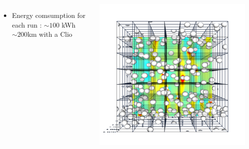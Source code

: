 \documentclass{sintefbeamer}
\begin{document}
\begin{frame}
\begin{columns}
{\begin{itemize}
 \item Energy comsumption for each run : $\sim 100$ kWh $\sim 200 $km with a Clio
\end{itemize}
  }
  \vfill
  \centering
  \href{videos/DNS.mp4}{}
  \includegraphics[width =  \textwidth]{image/PHI_01_Ga_75.png}

  \end{columns}
\end{frame}
\end{document}
